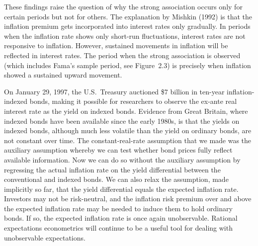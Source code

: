 These findings raise the question of why the strong association occurs only for
certain periods but not for others. The explanation by Mishkin (1992) is that the
inflation premium gets incorporated into interest rates only gradually. In periods
when the inflation rate shows only short-run fluctuations, interest rates are not
responsive to inflation. However, sustained movements in inflation will be reflected
in interest rates. The period when the strong association is observed (which
includes Fama's sample period, see Figure~2.3) is precisely when inflation showed
a sustained upward movement.

On January 29, 1997, the U.S.\ Treasury auctioned \$7 billion in ten-year
inflation-indexed bonds, making it possible for researchers to observe the ex-ante
real interest rate as the yield on indexed bonds. Evidence from Great Britain,
where indexed bonds have been available since the early 1980s, is that the yields
on indexed bonds, although much less volatile than the yield on ordinary bonds,
are not constant over time. The constant-real-rate assumption that we made was
the auxiliary assumption whereby we can test whether bond prices fully reflect
available information. Now we can do so without the auxiliary assumption by
regressing the actual inflation rate on the yield differential between the conventional and indexed bonds. We can also relax the assumption, made implicitly so
far, that the yield differential equals the expected inflation rate. Investors may not
be risk-neutral, and the inflation risk premium over and above the expected inflation rate may be needed to induce them to hold ordinary bonds. If so, the expected
inflation rate is once again unobservable. Rational expectations econometrics will
continue to be a useful tool for dealing with unobservable expectations.

